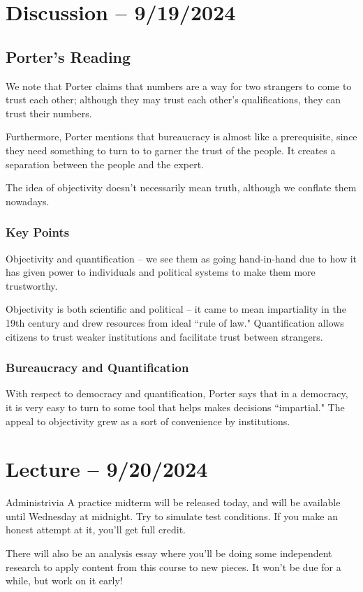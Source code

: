 \documentclass[openany]{book}
\begin{document}
\section{Discussion -- 9/19/2024}
\subsection{Porter's Reading}
We note that Porter claims that numbers are a way for two strangers to come to trust each other; although they may trust each other's qualifications, they can trust their numbers.

Furthermore, Porter mentions that bureaucracy is almost like a prerequisite, since they need something to turn to to garner the trust of the people. It creates a separation between the people and the expert.

The idea of objectivity doesn't necessarily mean truth, although we conflate them nowadays.

\subsubsection{Key Points}
Objectivity and quantification -- we see them as going hand-in-hand due to how it has given power to individuals and political systems to make them more trustworthy.

Objectivity is both scientific and political -- it came to mean impartiality in the 19th century and drew resources from ideal ``rule of law." Quantification allows citizens to trust weaker institutions and facilitate trust between strangers.

\subsubsection{Bureaucracy and Quantification}
With respect to democracy and quantification, Porter says that in a democracy, it is very easy to turn to some tool that helps makes decisions ``impartial." The appeal to objectivity grew as a sort of convenience by institutions.

\section{Lecture -- 9/20/2024}
\begin{miscbox}{Administrivia}
	A practice midterm will be released today, and will be available until Wednesday at midnight. Try to simulate test conditions. If you make an honest attempt at it, you'll get full credit.
	
	There will also be an analysis essay where you'll be doing some independent research to apply content from this course to new pieces. It won't be due for a while, but work on it early! 
\end{miscbox}
\end{document}
